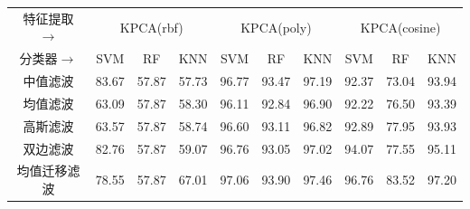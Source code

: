 \documentclass[12pt,hyperref,a4paper,UTF8]{ctexart}
\begin{document}
{\begin{table}[!h]
\begin{tabular}{@{}clllllllll@{}}
		\hline
		特征提取$\rightarrow$    & \multicolumn{3}{c}{KPCA(rbf)}                                              & \multicolumn{3}{c}{KPCA(poly)}                                             & \multicolumn{3}{c}{KPCA(cosine)}                                           \\
		分类器$\rightarrow$     & \multicolumn{1}{c}{SVM} & \multicolumn{1}{c}{RF} & \multicolumn{1}{c}{KNN} & \multicolumn{1}{c}{SVM} & \multicolumn{1}{c}{RF} & \multicolumn{1}{c}{KNN} & \multicolumn{1}{c}{SVM} & \multicolumn{1}{c}{RF} & \multicolumn{1}{c}{KNN} \\
		\hline
		中值滤波                 & 83.67                   & 57.87                  & 57.73                   & 96.77                   & 93.47                  & 97.19                   & 92.37                   & 73.04                  & 93.94                   \\
		均值滤波                 & 63.09                   & 57.87                  & 58.30                   & 96.11                   & 92.84                  & 96.90                   & 92.22                   & 76.50                  & 93.39                   \\
		高斯滤波                 & 63.57                   & 57.87                  & 58.74                   & 96.60                   & 93.11                  & 96.82                   & 92.89                   & 77.95                  & 93.93                   \\
		双边滤波                 & 82.76                   & 57.87                  & 59.07                   & 96.76                   & 93.05                  & 97.02                   & 94.07                   & 77.55                  & 95.11                   \\
		均值迁移滤波               & 78.55                   & 57.87                  & 67.01                   & 97.06                   & 93.90                  & 97.46                   & 96.76                   & 83.52                  & 97.20                  \\
		\hline
	\end{tabular}
\end{table}




}
\end{document}
